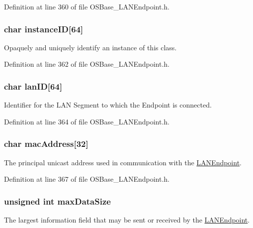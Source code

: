 Definition at line 360 of file OSBase\_\-LANEndpoint.h.\hypertarget{struct_l_a_n_endpoint_a9c118b2dca982f7e028eac6ce61f473d}{
\subsubsection[{instanceID}]{\setlength{\rightskip}{0pt plus 5cm}char {\bf instanceID}\mbox{[}64\mbox{]}}}
\label{struct_l_a_n_endpoint_a9c118b2dca982f7e028eac6ce61f473d}
Opaquely and uniquely identify an instance of this class. 

Definition at line 362 of file OSBase\_\-LANEndpoint.h.\hypertarget{struct_l_a_n_endpoint_ab5326c43b317d24e06693427a707553c}{
\subsubsection[{lanID}]{\setlength{\rightskip}{0pt plus 5cm}char {\bf lanID}\mbox{[}64\mbox{]}}}
\label{struct_l_a_n_endpoint_ab5326c43b317d24e06693427a707553c}
Identifier for the LAN Segment to which the Endpoint is connected. 

Definition at line 364 of file OSBase\_\-LANEndpoint.h.\hypertarget{struct_l_a_n_endpoint_ad93c6705b6e27c077473da7d9c059d35}{
\subsubsection[{macAddress}]{\setlength{\rightskip}{0pt plus 5cm}char {\bf macAddress}\mbox{[}32\mbox{]}}}
\label{struct_l_a_n_endpoint_ad93c6705b6e27c077473da7d9c059d35}
The principal unicast address used in communication with the \hyperlink{struct_l_a_n_endpoint}{LANEndpoint}. 

Definition at line 367 of file OSBase\_\-LANEndpoint.h.\hypertarget{struct_l_a_n_endpoint_a029105f833e0c92826a6738c6d8f88fd}{
\subsubsection[{maxDataSize}]{\setlength{\rightskip}{0pt plus 5cm}unsigned int {\bf maxDataSize}}}
\label{struct_l_a_n_endpoint_a029105f833e0c92826a6738c6d8f88fd}
The largest information field that may be sent or received by the \hyperlink{struct_l_a_n_endpoint}{LANEndpoint}. 

